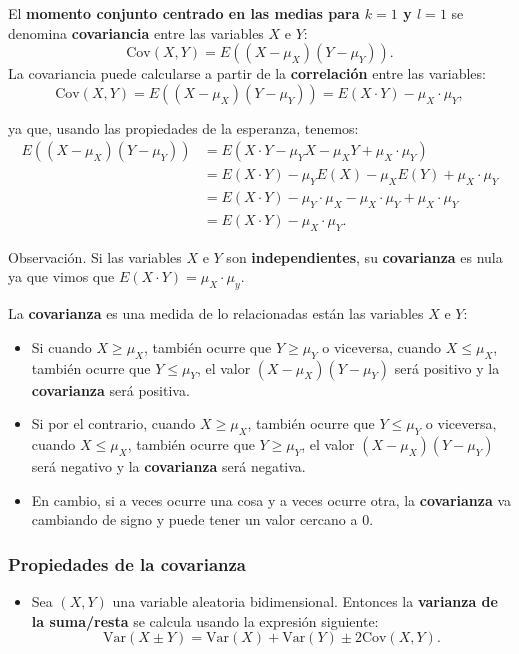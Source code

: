 \documentclass[]{book}
\providecommand{\tightlist}{%
  \setlength{\itemsep}{0pt}\setlength{\parskip}{0pt}}
\begin{document}
El \textbf{momento conjunto centrado en las medias para \(k=1\) y \(l=1\)} se denomina \textbf{covariancia} entre las variables \(X\) e \(Y\):
\[
\mathrm{Cov}(X,Y)=E((X-\mu_X)(Y-\mu_Y)).
\]
La covariancia puede calcularse a partir de la \textbf{correlación} entre las variables:
\[
\mathrm{Cov}(X,Y)=E((X-\mu_X)(Y-\mu_Y))=E(X\cdot Y)-\mu_X\cdot \mu_Y,
\]

ya que, usando las propiedades de la esperanza, tenemos:
\[
\begin{array}{rl}
E((X-\mu_X)(Y-\mu_Y)) & =E(X\cdot Y-\mu_Y X-\mu_X Y+\mu_X\cdot \mu_Y)\\ & =E(X\cdot Y)-\mu_YE(X)-\mu_X E(Y)+\mu_X\cdot \mu_Y \\ &  = E(X\cdot Y)-\mu_Y\cdot \mu_X-\mu_X \cdot \mu_Y+\mu_X\cdot \mu_Y \\ & = E(X\cdot Y)-\mu_X\cdot \mu_Y.
\end{array}
\]

Observación.
Si las variables \(X\) e \(Y\) son \textbf{independientes}, su \textbf{covarianza} es nula ya que vimos que \(E(X\cdot Y)=\mu_X\cdot \mu_y\).

La \textbf{covarianza} es una medida de lo relacionadas están las variables \(X\) e \(Y\):

\begin{itemize}
\item
  Si cuando \(X\geq \mu_X\), también ocurre que \(Y\geq \mu_Y\) o viceversa, cuando \(X\leq \mu_X\), también ocurre que \(Y\leq \mu_Y\), el valor \((X-\mu_X)(Y-\mu_Y)\) será positivo y la \textbf{covarianza} será positiva.
\item
  Si por el contrario, cuando \(X\geq \mu_X\), también ocurre que \(Y\leq \mu_Y\) o viceversa, cuando \(X\leq \mu_X\), también ocurre que \(Y\geq \mu_Y\), el valor \((X-\mu_X)(Y-\mu_Y)\) será negativo y la \textbf{covarianza} será negativa.
\item
  En cambio, si a veces ocurre una cosa y a veces ocurre otra, la \textbf{covarianza} va cambiando de signo y puede tener un valor cercano a 0.
\end{itemize}

\hypertarget{propiedades-de-la-covarianza}{%
\subsubsection{Propiedades de la covarianza}\label{propiedades-de-la-covarianza}}

\begin{itemize}
\tightlist
\item
  Sea \((X,Y)\) una variable aleatoria bidimensional. Entonces la \textbf{varianza de la suma/resta} se calcula usando la expresión siguiente:
  \[
  \mathrm{Var}(X\pm Y)=\mathrm{Var}(X)+\mathrm{Var}(Y)\pm 2 \mathrm{Cov}(X,Y).
  \]
\end{itemize}
\end{document}
